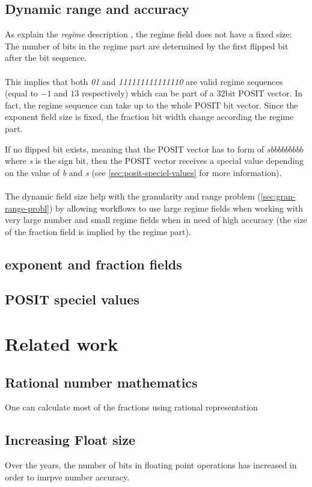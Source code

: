 \documentclass[10pt]{article}
\begin{document}
\subsection{Dynamic range and accuracy}\label{sec:dynam-range-accur}

As explain the \textit{regime} description , the regime
field does not have a fixed size: The number of bits in the regime part are
determined by the first flipped bit after the bit sequence. \\\\
This implies that both \textit{01} and \textit{111111111111110} are valid regime sequences
(equal to $-1$ and $13$ respectively) which can be part of a 32bit POSIT vector.
In fact, the regime sequence can take up to the whole POSIT bit vector.
Since the exponent field size is fixed, the fraction bit width change according
the regime part.

If no flipped bit exists, meaning that the POSIT vector has to form of
\textit{$sbbbbbbbbb$} where \textit{s} is the sign bit, then the POSIT vector
receives a special value depending on the value of \textit{b} and \textit{s}
(see \autoref{sec:posit-speciel-values} for more information).

\paragraph{}
The dynamic field size help with the granularity and range problem
(\ref{sec:gran-range-probl}) by allowing workflows to use large regime
fields when working with very large number and small regime fields when in need
of high accuracy (the size of the fraction field is implied by the regime part).

\subsection{exponent and fraction fields}\label{sec:expon-fract-fields}

\subsection{POSIT speciel values}\label{sec:posit-speciel-values}




\section{Related work}\label{sec:relatedwork}

\subsection{Rational number mathematics}\label{sec:rationalnumbers}

One can calculate most of the fractions using rational representation

\subsection{Increasing Float size}\label{sec:increasefloat}

Over the years, the number of bits in floating point operations has
increased in order to imrpve number accuracy.
\end{document}
